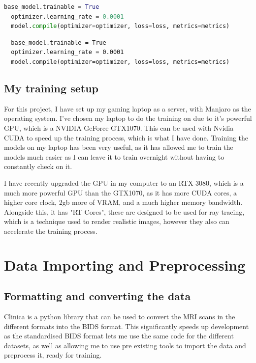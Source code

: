 \documentclass[]{final_report}
\begin{document}
\begin{lstlisting}[language=Python]
  base_model.trainable = True
  optimizer.learning_rate = 0.0001
  model.compile(optimizer=optimizer, loss=loss, metrics=metrics)
\end{lstlisting}

\begin{verbatim}
  base_model.trainable = True
  optimizer.learning_rate = 0.0001
  model.compile(optimizer=optimizer, loss=loss, metrics=metrics)
\end{verbatim}


\section{My training setup}
For this project, I have set up my gaming laptop as a server, with Manjaro\cite{Manjaro} as the operating system.
I've chosen my laptop to do the training on due to it's powerful GPU, which is a NVIDIA GeForce GTX1070\cite{GTX1070}.
This can be used with Nvidia CUDA\cite{CUDA} to speed up the training process, which is what I have done.
Training the models on my laptop has been very useful, as it has allowed me to train the models much easier
as I can leave it to train overnight without having to constantly check on it.

I have recently upgraded the GPU in my computer to an RTX 3080\cite{RTX3080}, which is a much more powerful GPU than the GTX1070, as it has more CUDA cores, a higher core clock, 2gb more of VRAM, and a much higher memory bandwidth. Alongside this, it has "RT Cores",
these are designed to be used for ray tracing, which is a technique used to render realistic images, however they also can accelerate the training process.

\chapter{Data Importing and Preprocessing}

\section{Formatting and converting the data}
Clinica\cite{SAMPERGONZALEZ2018504} is a python library that can be used to convert the MRI scans in the different formats into the BIDS format\cite{Gorgolewski2016}.
This significantly speeds up development as the standardised BIDS format lets me use the same code for the different datasets, as well as allowing me to use pre existing tools to import the data and preprocess it, ready for training.
\end{document}
